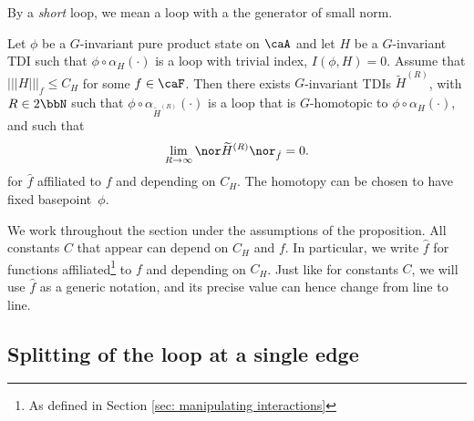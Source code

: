 By a \emph{short} loop, we mean a loop with a the generator of small norm. 
\begin{proposition}\label{prop: loop contractible to small loop}
	Let $\phi$ be a $G$-invariant pure product state on $\caA$ and let $H$ be a $G$-invariant TDI such that $\phi\circ \alpha_H(\cdot)$ is a loop with trivial index, $I(\phi,H)= 0$. Assume that $|||H |||_f \leq C_H$ for some $f\in\caF$. Then there exists $G$-invariant TDIs $\widetilde H^{(R)}$, with $R\in 2\bbN$ such that
	$\phi\circ\alpha_{\widetilde H^{(R)}}(\cdot)$ is a loop that is $G$-homotopic to $\phi\circ\alpha_{H}(\cdot)$, and such that
	$$
	\lim_{R\to\infty} \nor \widetilde H^{(R)}\nor_{\hat{f}} =0.
	$$  
	for $\hat{f}$ affiliated to $f$ and depending on $C_H$. The homotopy can be chosen to have fixed basepoint~$\phi$. 
\end{proposition} 
We work throughout the section under the assumptions of the proposition. All constants $C$ that appear can depend on $C_H$ and $f$. 
In particular, we write $\hat{f}$ for functions affiliated\footnote{As defined in Section \ref{sec: manipulating interactions}} to $f$ and depending on $C_H$.
Just like for constants $C$, we will use  $\hat{f}$ as a generic notation, and its precise value can hence change from line to line.   


\subsection{Splitting of the loop at a single edge}\label{sec: splitting at single edge}

